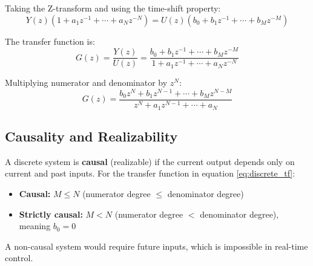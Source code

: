Taking the Z-transform and using the time-shift property:
\begin{equation}
Y(z)(1 + a_1 z^{-1} + \cdots + a_N z^{-N}) = U(z)(b_0 + b_1 z^{-1} + \cdots + b_M z^{-M})
\end{equation}

The transfer function is:
\begin{equation}
\boxed{G(z) = \frac{Y(z)}{U(z)} = \frac{b_0 + b_1 z^{-1} + \cdots + b_M z^{-M}}{1 + a_1 z^{-1} + \cdots + a_N z^{-N}}}
\label{eq:discrete_tf}
\end{equation}

Multiplying numerator and denominator by $z^N$:
\begin{equation}
G(z) = \frac{b_0 z^N + b_1 z^{N-1} + \cdots + b_M z^{N-M}}{z^N + a_1 z^{N-1} + \cdots + a_N}
\end{equation}

\subsection{Causality and Realizability}

A discrete system is \textbf{causal} (realizable) if the current output depends only on current and past inputs. For the transfer function in equation \eqref{eq:discrete_tf}:

\begin{itemize}
    \item \textbf{Causal:} $M \leq N$ (numerator degree $\leq$ denominator degree)
    \item \textbf{Strictly causal:} $M < N$ (numerator degree $<$ denominator degree), meaning $b_0 = 0$
\end{itemize}

A non-causal system would require future inputs, which is impossible in real-time control.

